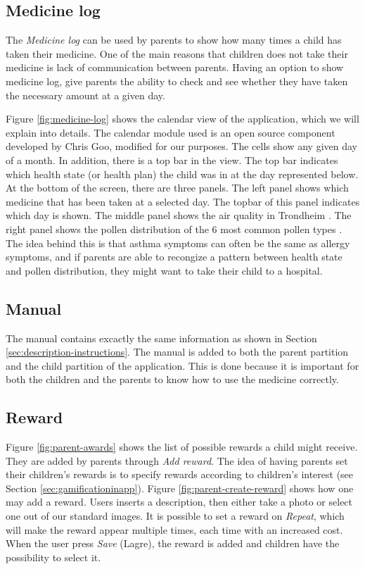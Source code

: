 \subsection{Medicine log}
\label{sec:description-medicine-log}
The \emph{Medicine log} can be used by parents to show how many times a child has taken their medicine. One of the main reasons that children does not take their medicine is lack of communication between parents. Having an option to show medicine log, give parents the ability to check and see whether they have taken the necessary amount at a given day.

Figure \ref{fig:medicine-log} shows the calendar view of the application, which we will explain into details. The calendar module used is an open source component developed by Chris Goo, modified for our purposes. The cells show any given day of a month. In addition, there is a top bar in the view. The top bar indicates which health state (or health plan) the child was in at the day represented below. At the bottom of the screen, there are three panels. The left panel shows which medicine that has been taken at a selected day. The topbar of this panel indicates which day is shown. The middle panel shows the air quality in Trondheim . The right panel shows the pollen distribution of the 6 most common pollen types . The idea behind this is that asthma symptoms can often be the same as allergy symptoms, and if parents are able to recongize a pattern between health state and pollen distribution, they might want to take their child to a hospital.    

 

\subsection{Manual}
\label{sec:description-manual}
The manual contains excactly the same information as shown in Section \ref{sec:description-instructions}. The manual is added to both the parent partition and the child partition of the application. This is done because it is important for both the children and the parents to know how to use the medicine correctly. 


\subsection{Reward}
\label{sec:description-manage-rewards}
Figure \ref{fig:parent-awards} shows the list of possible rewards a child might receive. They are added by parents through \emph{Add reward}. The idea of having parents set their children's rewards is to specify rewards according to children's interest (see Section \ref{sec:gamificationinapp}). Figure \ref{fig:parent-create-reward} shows how one may add a reward. Users inserts a description, then either take a photo or select one out of our standard images. It is possible to set a reward on \emph{Repeat}, which will make the reward appear multiple times, each time with an increased cost.        
When the user press \emph{Save} (Lagre), the reward is added and children have the possibility to select it. 
 
